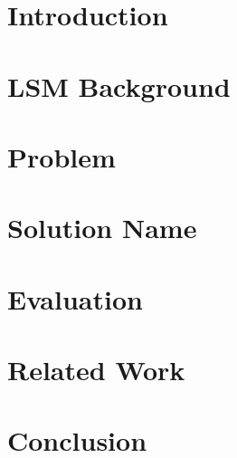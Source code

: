 \documentclass[sigconf]{acmart}
\begin{document}
\begin{abstract}
    
\end{abstract}




\maketitle

\section{Introduction}
\label{sec:intro}


\section{LSM Background}
\label{sec:background}
 


\section{Problem}
\label{sec:design_space}

 
\section{Solution Name}
\label{sec:solution}


% 

\section{Evaluation}
\label{sec:experimental_results}


\section{Related Work}
\label{sec:related_work}

 
\section{Conclusion}
\label{sec:conclusion}



\balance 
{
 
} 
\end{document}
